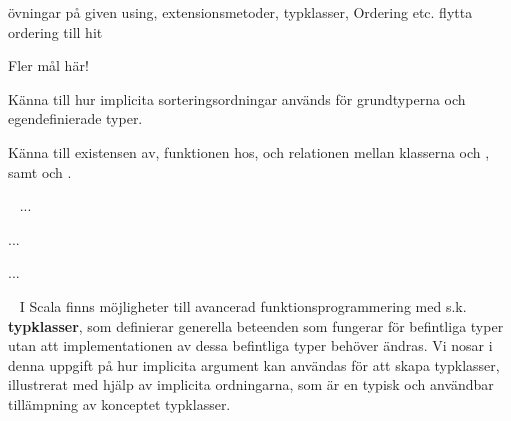 

\ifPreSolution


\Exercise{\ExeWeekELEVEN}\label{exe:W11}

\TODO övningar på given using, extensionsmetoder, typklasser, Ordering etc.
\TODO flytta ordering till hit

\begin{Goals}
\item \TODO Fler mål här!
\item Känna till hur implicita sorteringsordningar används för grundtyperna och egendefinierade typer.
\item Känna till existensen av, funktionen hos, och relationen mellan klasserna  och , samt   och .

\end{Goals}

\begin{Preparations}
\item {}
\end{Preparations}

\BasicTasks %

\else

\ExerciseSolution{\ExeWeekELEVEN}

\BasicTasks %

\fi



\QUESTBEGIN

\Task  \what~  \TODO ...

\Subtask \TODO ... 



\SOLUTION


\TaskSolved \what

\SubtaskSolved  \TODO ...


\QUESTEND



\QUESTBEGIN

\Task  \what~  I Scala finns möjligheter till avancerad funktionsprogrammering med s.k. \textbf{typklasser}, som definierar generella beteenden som fungerar för befintliga typer utan att implementationen av dessa befintliga typer behöver ändras. Vi nosar i denna uppgift på hur implicita argument kan användas för att skapa typklasser, illustrerat med hjälp av implicita ordningarna, som är en typisk och användbar tillämpning av konceptet typklasser.

